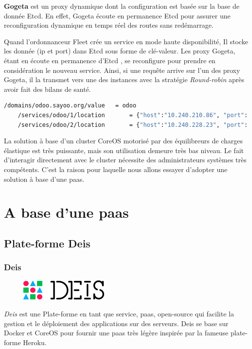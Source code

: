 \begin{onehalfspace}
\textbf{Gogeta} est un proxy dynamique dont la configuration est basée sur la base de donnée Etcd. En effet, Gogeta écoute en permanence Etcd pour assurer une reconfiguration dynamique en temps réel des routes sans redémarrage.

Quand l'ordonnanceur Fleet crée un service en mode haute disponibilité, Il stocke les donnée (\acrshort{ip} et port) dans Etcd sous forme de clé-valeur. Les proxy Gogeta, étant en écoute en permanence d'Etcd , se reconfigure pour prendre en considération le nouveau service. Ainsi, si une requête arrive sur l'un des proxy Gogeta, il la transmet vers une des instances avec la stratégie \emph{Round-robin} après avoir fait des bilans de santé.

\begin{lstlisting}[language=bash,caption=Contenu de la base de donnée Etcd]
	/domains/odoo.sayoo.org/value 	= odoo
	/services/odoo/1/location		= {"host":"10.240.210.86", "port": 42654}
	/services/odoo/2/location		= {"host":"10.240.228.23", "port": 42669}
\end{lstlisting}


La solution à base d'un cluster CoreOS motorisé par des équilibreurs de charges élastique est très puissante, mais son utilisation demeure très bas niveau. Le fait d’interagir directement avec le cluster nécessite des administrateurs systèmes très compétents. C'est la raison pour laquelle nous allons essayer d'adopter une solution à base d'une \acrshort{paas}.


\section{A base d'une \acrshort{paas}}
\subsection{Plate-forme Deis}

\subsubsection*{Deis}

\begin{figure}
\centering
\includegraphics[scale=0.4]{chapitre5/assets/deis}
\end{figure}
\noindent \emph{Deis} est une Plate-forme en tant que service, \acrshort{paas}, open-source qui facilite la gestion et le déploiement des applications sur des serveurs. Deis se base sur Docker et CoreOS pour fournir une \acrshort{paas} très légère inspirée par la fameuse plate-forme Heroku.



\end{onehalfspace}
